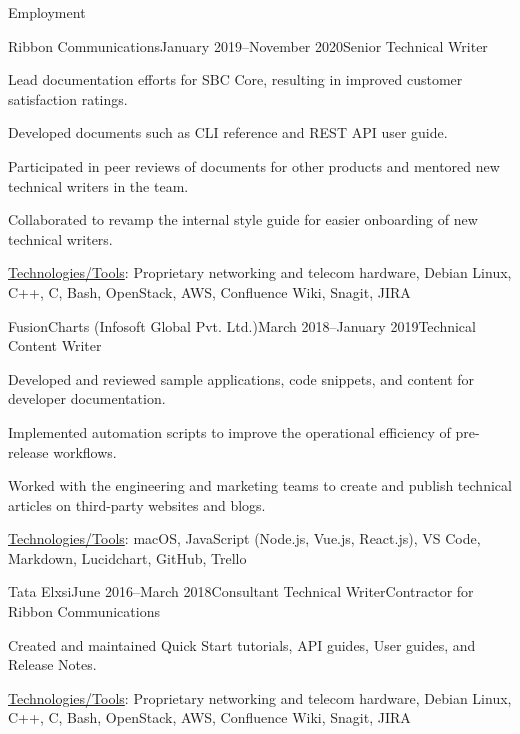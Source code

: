 \documentclass{resume} %
\begin{document}
\begin{rSection}{Employment}
\vspace{1cm}

\begin{rSubsection}{Ribbon Communications}{January 2019–November 2020}{Senior Technical Writer}{}
\item Lead documentation efforts for SBC Core, resulting in improved customer satisfaction ratings.
\item Developed documents such as CLI reference and REST API user guide.
\item Participated in peer reviews of documents for other products and mentored new technical writers in the team.
\item Collaborated to revamp the internal style guide for easier onboarding of new technical writers.
\item \underline{Technologies/Tools}: Proprietary networking and telecom hardware, Debian Linux, C++, C, Bash, OpenStack, AWS, Confluence Wiki, Snagit, JIRA
\end{rSubsection}


\begin{rSubsection}{FusionCharts (Infosoft Global Pvt. Ltd.)}{March 2018–January 2019}{Technical Content Writer}{}
\item Developed and reviewed sample applications, code snippets, and content for developer documentation.
\item Implemented automation scripts to improve the operational efficiency of pre-release workflows.
\item Worked with the engineering and marketing teams to create and publish technical articles on third-party websites and blogs.
\item \underline{Technologies/Tools}: macOS, JavaScript (Node.js, Vue.js, React.js), VS Code, Markdown, Lucidchart, GitHub, Trello
\end{rSubsection}


\begin{rSubsection}{Tata Elxsi}{June 2016–March 2018}{Consultant Technical Writer}{Contractor for Ribbon Communications}
\item Created and maintained Quick Start tutorials, API guides, User guides, and Release Notes.
\item \underline{Technologies/Tools}: Proprietary networking and telecom hardware, Debian Linux, C++, C, Bash, OpenStack, AWS, Confluence Wiki, Snagit, JIRA
\end{rSubsection}


\end{rSection}
\end{document}
